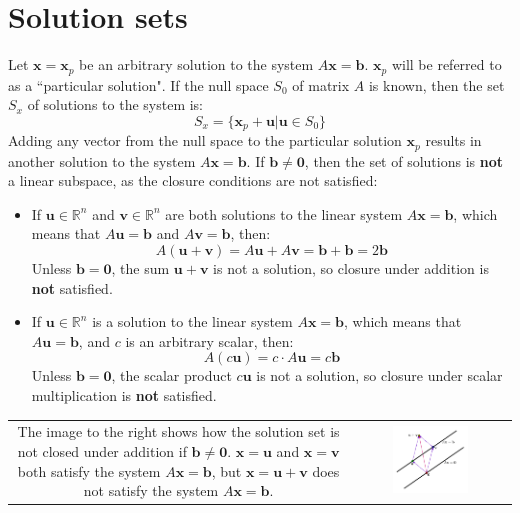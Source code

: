 \documentclass{article}
\begin{document}
\section*{Solution sets}

Let \(\mathbf{x} = \mathbf{x}_p\) be an arbitrary solution to the system \(A\mathbf{x} = \mathbf{b}\). \(\mathbf{x}_p\) will be referred to as a ``particular solution". If the null space \(S_0\) of matrix \(A\) is known, then the set \(S_x\) of solutions to the system is:
\[S_x = \{\mathbf{x}_p + \mathbf{u} | \mathbf{u} \in S_0\}\]
Adding any vector from the null space to the particular solution \(\mathbf{x}_p\) results in another solution to the system \(A\mathbf{x} = \mathbf{b}\). If \(\mathbf{b} \neq \mathbf{0}\), then the set of solutions is {\bf not} a linear subspace, as the closure conditions are not satisfied:

\begin{itemize}
\item If \(\mathbf{u} \in \mathbb{R}^n\) and \(\mathbf{v} \in \mathbb{R}^n\) are both solutions to the linear system \(A\mathbf{x} = \mathbf{b}\), which means that \(A\mathbf{u} = \mathbf{b}\) and \(A\mathbf{v} = \mathbf{b}\), then: 
\[A(\mathbf{u} + \mathbf{v}) = A\mathbf{u} + A\mathbf{v} = \mathbf{b} + \mathbf{b} = 2\mathbf{b}\]
Unless \(\mathbf{b} = \mathbf{0}\), the sum \(\mathbf{u} + \mathbf{v}\) is not a solution, so closure under addition is {\bf not} satisfied.
\item If \(\mathbf{u} \in \mathbb{R}^n\) is a solution to the linear system \(A\mathbf{x} = \mathbf{b}\), which means that \(A\mathbf{u} = \mathbf{b}\), and \(c\) is an arbitrary scalar, then: 
\[A(c\mathbf{u}) = c \cdot A\mathbf{u} = c\mathbf{b}\]
Unless \(\mathbf{b} = \mathbf{0}\), the scalar product \(c\mathbf{u}\) is not a solution, so closure under scalar multiplication is {\bf not} satisfied.  
\end{itemize} 

\begin{tabular}{cc}
\parbox{0.4\textwidth}{
The image to the right shows how the solution set is not closed under addition if \(\mathbf{b} \neq \mathbf{0}\). \(\mathbf{x} = \mathbf{u}\) and \(\mathbf{x} = \mathbf{v}\) both satisfy the system \(A\mathbf{x} = \mathbf{b}\), but \(\mathbf{x} = \mathbf{u} + \mathbf{v}\) does not satisfy the system \(A\mathbf{x} = \mathbf{b}\). 
} & \parbox{0.5\textwidth}{
\includegraphics[width = 0.5\textwidth]{solution_sets_are_not_linear_subspaces}
}
\end{tabular}
\end{document}
